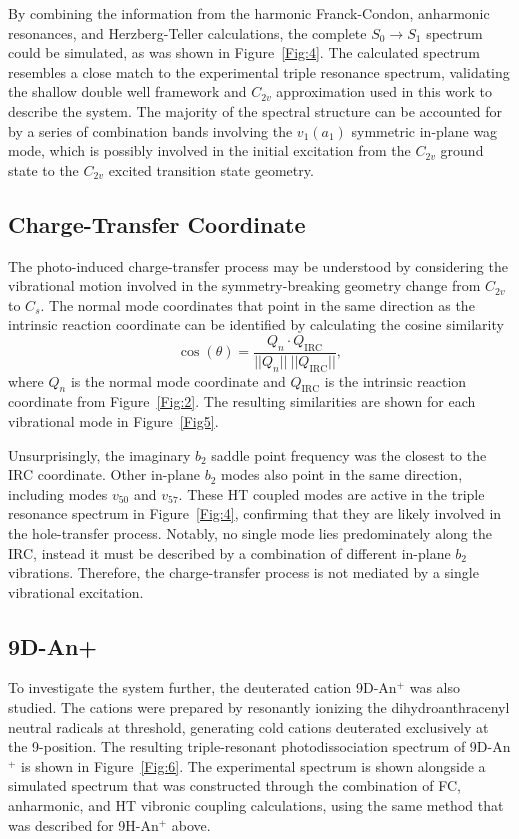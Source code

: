 \documentclass[journal=jpcafh,manuscript=article,layout=onecolumn, 12pt]{achemso}
\begin{document}
By combining the information from the harmonic Franck-Condon, anharmonic resonances, and Herzberg-Teller calculations, the complete $S_0\rightarrow S_1$ spectrum could be simulated, as was shown in Figure~\ref{Fig:4}. The calculated spectrum resembles a close match to the experimental triple resonance spectrum, validating the shallow double well framework and $C_{2v}$ approximation used in this work to describe the system. The majority of the spectral structure can be accounted for by a series of combination bands involving the $v_1(a_1)$ symmetric in-plane wag mode, which is possibly involved in the initial excitation from the $C_{2v}$ ground state to the $C_{2v}$ excited transition state geometry. 

\subsection{Charge-Transfer Coordinate}
The photo-induced charge-transfer process may be understood by considering the vibrational motion involved in the symmetry-breaking geometry change from $C_{2v}$ to $C_s$. The normal mode coordinates that point in the same direction as the intrinsic reaction coordinate can be identified by calculating the cosine similarity
\begin{equation}
	\cos(\theta) = \frac{Q_n\cdot Q_{\text{IRC}}}{||Q_n||~||Q_{\text{IRC}}||},
\end{equation}
where $Q_n$ is the normal mode coordinate and $Q_{\text{IRC}}$ is the intrinsic reaction coordinate from Figure~\ref{Fig:2}. The resulting similarities are shown for each vibrational mode in Figure~\ref{Fig5}.

Unsurprisingly, the imaginary $b_2$ saddle point frequency was the closest to the IRC coordinate. Other in-plane $b_2$ modes also point in the same direction, including modes $v_{50}$ and $v_{57}$. These HT coupled modes are active in the triple resonance spectrum in Figure~\ref{Fig:4}, confirming that they are likely involved in the hole-transfer process. %
Notably, no single mode lies predominately along the IRC, instead it must be described by a combination of different in-plane $b_2$ vibrations. Therefore, the charge-transfer process is not mediated by a single vibrational excitation.

\subsection{9D-An+}
To investigate the system further, the deuterated cation 9D-An$^+$ was also studied. The cations were prepared by resonantly ionizing the dihydroanthracenyl neutral radicals at threshold, generating cold cations deuterated exclusively at the 9-position. The resulting triple-resonant photodissociation spectrum of 9D-An$^+$ is shown in Figure~\ref{Fig:6}. The experimental spectrum is shown alongside a simulated spectrum that was constructed through the combination of FC, anharmonic, and HT vibronic coupling calculations, using the same method that was described for 9H-An$^+$ above.
\end{document}
